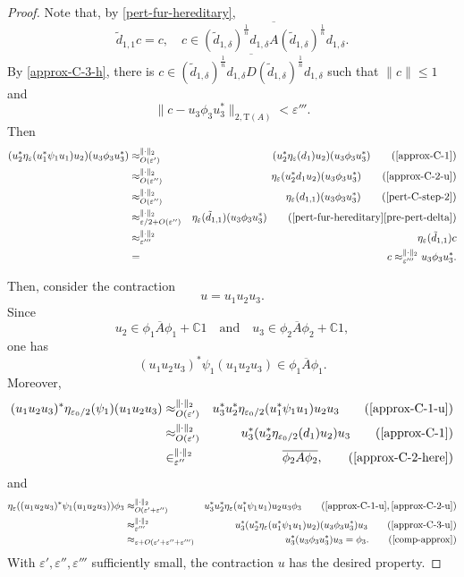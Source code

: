 \documentclass[12pt, oneside, psamsfonts]{amsart}
\theoremstyle{definition}
\theoremstyle{remark}
\numberwithin{equation}{section}
\newcommand{\norm}[1]{\| #1\|}
\newcommand{\Comp}{\mathbb C}
\newcommand{\eps}{\varepsilon}
\newcommand{\tr}{\mathrm{T}}
\begin{document}
\begin{proof}
Note that, by \eqref{pert-fur-hereditary},
$$\tilde{d}_{1, 1}c = c,\quad c \in \overline{(\tilde{d}_{1, \delta})^{\frac{1}{n}} d_{1, \delta} A (\tilde{d}_{1, \delta})^{\frac{1}{n}} d_{1, \delta} }.$$
By \eqref{approx-C-3-h}, there is $c \in \overline{(\tilde{d}_{1, \delta})^{\frac{1}{n}} d_{1, \delta}D (\tilde{d}_{1, \delta})^{\frac{1}{n}} d_{1, \delta}}$ such that $\norm{c} \leq 1$ and
$$ \norm{c - u_3\phi_3 u_3^*}_{2, \tr(A)} < \eps'''.$$ 
Then 
\begin{eqnarray}\label{comp-approx}
 ( u^*_2\eta_{\eps}(u_1^* \psi_1 u_1)u_2) (u_3 \phi_3 u_3^*) & \approx_{O(\eps')}^{\norm{\cdot}_2} &  ( u^*_2\eta_{\eps}(d_1)u_2) (u_3 \phi_3 u_3^*) \quad\quad ( \eqref{approx-C-1} )   \\
 & \approx_{O(\eps'')}^{\norm{\cdot}_2} & \eta_{\eps}(u_2^*d_1 u_2) (u_3 \phi_3 u_3^*) \quad\quad (\eqref{approx-C-2-u})   \nonumber \\
 & \approx_{O(\eps'')}^{\norm{\cdot}_2} & \eta_{\eps}(d_{1, 1}) (u_3 \phi_3 u_3^*) \quad\quad (\eqref{pert-C-step-2})   \nonumber \\
 & \approx_{\eps/2+O(\eps'')}^{\norm{\cdot}_2} &  \eta_{\eps}(\tilde{d}_{1, 1}) (u_3 \phi_3 u_3^*) \quad \quad (\eqref{pert-fur-hereditary} \eqref{pre-pert-delta}) \nonumber \\
 & \approx_{\eps'''}^{\norm{\cdot}_2} &  \eta_{\eps}(\tilde{d}_{1, 1})  c \nonumber \\
 &=&c \approx_{\eps'''}^{\norm{\cdot}_2} u_3 \phi_3 u_3^*. \nonumber
\end{eqnarray} 


Then, consider the contraction $$ u = u_1u_2u_3.$$
Since 
$$u_2 \in \overline{\phi_1 A \phi_1}+\Comp 1\quad \mathrm{and}\quad u_3 \in \overline{\phi_2 A \phi_2} + \Comp 1, $$ one has
$$(u_1u_2u_3)^*\psi_1(u_1u_2u_3) \in \overline{\phi_1 A \phi_1}.$$
Moreover,
\begin{eqnarray*}
(u_1u_2u_3)^*\eta_{\eps_0/2}(\psi_1)(u_1u_2u_3)  & \approx_{O(\eps')}^{\norm{\cdot}_2} & u^*_3u_2^*\eta_{\eps_0/2}(u_1^*\psi_1 u_1)u_2 u_3 \quad\quad (\eqref{approx-C-1-u}) \\
& \approx_{O(\eps')}^{\norm{\cdot}_2} & u^*_3(u_2^*\eta_{\eps_0/2}(d_1)u_2) u_3 \quad\quad (\eqref{approx-C-1}) \\
& \in_{\eps''}^{\norm{\cdot}_2} & \overline{\phi_2 A \phi_2}, \quad\quad (\eqref{approx-C-2-here})
\end{eqnarray*}
and 
\begin{eqnarray*}
\eta_{\eps}((u_1u_2u_3)^*\psi_1(u_1u_2u_3)) \phi_3 & \approx_{O(\eps' + \eps'')}^{\norm{\cdot}_2} & u_3^*u_2^*\eta_\eps(u_1^*\psi_1 u_1)u_2u_3 \phi_3 \quad\quad (\eqref{approx-C-1-u}, \eqref{approx-C-2-u}) \\
 & \approx_{\eps'''}^{\norm{\cdot}_2} & u^*_3 (u^*_2  \eta_{\eps}(u_1^* \psi_1 u_1)u_2)(u_3 \phi_3 u_3^*) u_3 \quad\quad (\eqref{approx-C-3-u}) \\
 & \approx_{\eps + O(\eps'+\eps''+\eps''')} & u_3^* (u_3\phi_3 u_3^*) u_3= \phi_3. \quad\quad(\eqref{comp-approx})
 \end{eqnarray*}
With $\eps', \eps'', \eps'''$ sufficiently small, the contraction $u$ has the desired property.
\end{proof}
\end{document}

